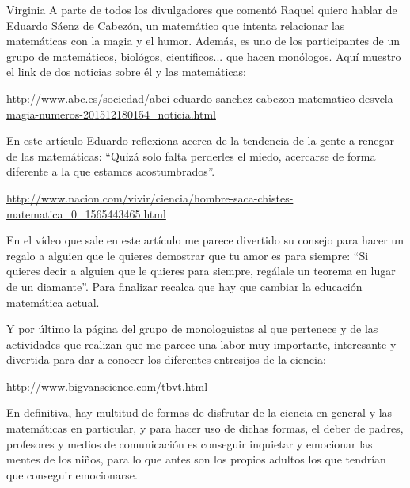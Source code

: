 \begin{opin}{\virgicolor}{Virginia}
A parte de todos los divulgadores que comentó Raquel quiero hablar de Eduardo Sáenz de Cabezón, un matemático que intenta relacionar las matemáticas con la magia y el humor. Además, es uno de los participantes de un grupo de matemáticos, biológos, científicos... que hacen monólogos. Aquí muestro el link de dos noticias sobre él y las matemáticas:




\url{http://www.abc.es/sociedad/abci-eduardo-sanchez-cabezon-matematico-desvela-magia-numeros-201512180154_noticia.html}

En este artículo Eduardo reflexiona acerca de la tendencia de la gente a renegar de las matemáticas: “Quizá solo falta perderles el miedo, acercarse de forma diferente a la que estamos acostumbrados”.

\url{http://www.nacion.com/vivir/ciencia/hombre-saca-chistes-matematica_0_1565443465.html}

En el vídeo que sale en este artículo me parece divertido su consejo para hacer un regalo a alguien que le quieres demostrar que tu amor es para siempre: “Si quieres decir a alguien que le quieres para siempre, regálale un teorema en lugar de un diamante”. Para finalizar recalca que hay que cambiar la educación matemática actual.

Y por último la página del grupo de monologuistas al que pertenece y de las actividades que realizan que me parece una labor muy importante, interesante y divertida para dar a conocer los diferentes entresijos de la ciencia:

\url{http://www.bigvanscience.com/tbvt.html}

En definitiva, hay multitud de formas de disfrutar de la ciencia en general y las matemáticas en particular, y para hacer uso de dichas formas, el deber de padres, profesores y medios de comunicación es conseguir inquietar y emocionar las mentes de los niños, para lo que antes son los propios adultos los que tendrían que conseguir emocionarse.

\end{opin}
